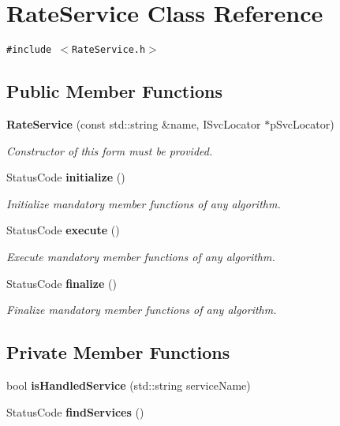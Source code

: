 \section{Rate\-Service Class Reference}
\label{classRateService}
{\tt \#include $<$Rate\-Service.h$>$}

\subsection*{Public Member Functions}
\begin{CompactItemize}
\item 
{\bf Rate\-Service} (const std::string \&name, ISvc\-Locator $\ast$p\-Svc\-Locator)
\begin{CompactList}\small\item\em Constructor of this form must be provided. \item\end{CompactList}\item 
Status\-Code {\bf initialize} ()
\begin{CompactList}\small\item\em Initialize mandatory member functions of any algorithm. \item\end{CompactList}\item 
Status\-Code {\bf execute} ()
\begin{CompactList}\small\item\em Execute mandatory member functions of any algorithm. \item\end{CompactList}\item 
Status\-Code {\bf finalize} ()
\begin{CompactList}\small\item\em Finalize mandatory member functions of any algorithm. \item\end{CompactList}\end{CompactItemize}
\subsection*{Private Member Functions}
\begin{CompactItemize}
\item 
bool {\bf is\-Handled\-Service} (std::string service\-Name)
\item 
Status\-Code {\bf find\-Services} ()
\end{CompactItemize}
